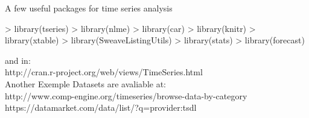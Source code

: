 \documentclass[11pt, a4paper]{article} %
\begin{document}
A few useful packages for time series analysis
\begin{Schunk}
\begin{Sinput}
> library(tseries)
> library(nlme)
> library(car)
> library(knitr)
> library(xtable)
> library(SweaveListingUtils)
> library(stats)
> library(forecast)
\end{Sinput}
\end{Schunk}
and in:\\

http://cran.r-project.org/web/views/TimeSeries.html\\

Another Exemple Datasets are avaliable at:\\

http://www.comp-engine.org/timeseries/browse-data-by-category\\
https://datamarket.com/data/list/?q=provider:tsdl\\
\end{document}
